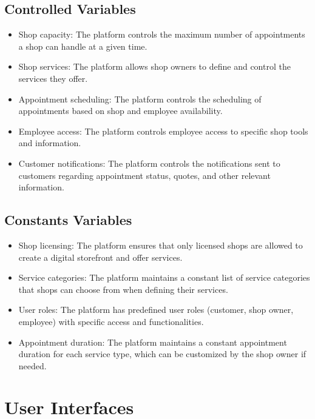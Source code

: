 \documentclass[12pt, titlepage]{article}
\begin{document}
\subsection{Controlled Variables}
\begin{itemize}
    \item Shop capacity: The platform controls the maximum number of appointments a shop can handle at a given time.
    \item Shop services: The platform allows shop owners to define and control the services they offer.
    \item Appointment scheduling: The platform controls the scheduling of appointments based on shop and employee availability.
    \item Employee access: The platform controls employee access to specific shop tools and information.
    \item Customer notifications: The platform controls the notifications sent to customers regarding appointment status, quotes, and other relevant information.
\end{itemize}

\subsection{Constants Variables}
\begin{itemize}
    \item Shop licensing: The platform ensures that only licensed shops are allowed to create a digital storefront and offer services.
    \item Service categories: The platform maintains a constant list of service categories that shops can choose from when defining their services.
    \item User roles: The platform has predefined user roles (customer, shop owner, employee) with specific access and functionalities.
    \item Appointment duration: The platform maintains a constant appointment duration for each service type, which can be customized by the shop owner if needed.
\end{itemize}

\section{User Interfaces}

\end{document}

